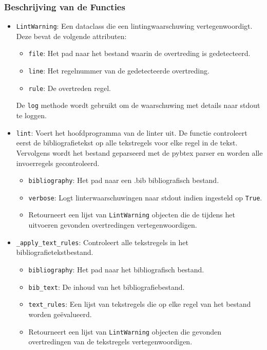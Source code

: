 \subsubsection{Beschrijving van de Functies}

\begin{itemize}
    \item \texttt{LintWarning}:
    Een dataclass die een lintingwaarschuwing vertegenwoordigt. Deze bevat de volgende attributen:
    \begin{itemize}
        \item \texttt{file}: Het pad naar het bestand waarin de overtreding is gedetecteerd.
        \item \texttt{line}: Het regelnummer van de gedetecteerde overtreding.
        \item \texttt{rule}: De overtreden regel.
    \end{itemize}
    De \texttt{log} methode wordt gebruikt om de waarschuwing met details naar stdout te loggen.

    \item \texttt{lint}:
    Voert het hoofdprogramma van de linter uit. De functie controleert eerst de bibliografietekst op alle tekstregels voor elke regel in de tekst. Vervolgens wordt het bestand geparseerd met de pybtex parser en worden alle invoerregels gecontroleerd.
    \begin{itemize}
        \item \texttt{bibliography}: Het pad naar een .bib bibliografisch bestand.
        \item \texttt{verbose}: Logt linterwaarschuwingen naar stdout indien ingesteld op \texttt{True}.
        \item Retourneert een lijst van \texttt{LintWarning} objecten die de tijdens het uitvoeren gevonden overtredingen vertegenwoordigen.
    \end{itemize}

    \item \texttt{\_apply\_text\_rules}:
    Controleert alle tekstregels in het bibliografietekstbestand.
    \begin{itemize}
        \item \texttt{bibliography}: Het pad naar het bibliografisch bestand.
        \item \texttt{bib\_text}: De inhoud van het bibliografiebestand.
        \item \texttt{text\_rules}: Een lijst van tekstregels die op elke regel van het bestand worden geëvalueerd.
        \item Retourneert een lijst van \texttt{LintWarning} objecten die gevonden overtredingen van de tekstregels vertegenwoordigen.
    \end{itemize}


\end{itemize}
